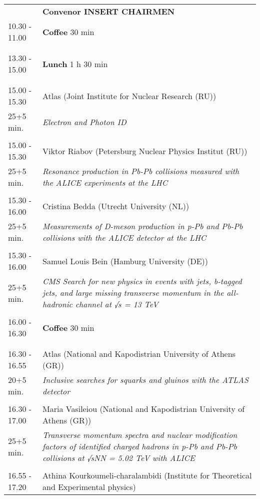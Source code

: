 \begin{longtable}{p{3cm}p{13cm}}
&\hfill {\bf Convenor INSERT CHAIRMEN }\\ 
10.30 - 11.00 & {\bf Coffee} \hfill 30 min \\ 
 & \\ 
 & \\ 
13.30 - 15.00 & {\bf Lunch} \hfill 1 h 30 min \\ 
 & \\ 
 & \\ 
15.00 - 15.30 & Atlas (Joint Institute for  Nuclear Research (RU))\\ 
25+5 min. & {\it Electron and Photon ID}\\ 
 & \\ 
15.00 - 15.30 & Viktor Riabov (Petersburg Nuclear Physics Institut (RU))\\ 
25+5 min. & {\it Resonance production in Pb-Pb collisions measured with the ALICE experiments at the LHC}\\ 
 & \\ 
15.30 - 16.00 & Cristina Bedda (Utrecht University (NL))\\ 
25+5 min. & {\it Measurements of D-meson production in p-Pb and Pb-Pb collisions with the ALICE detector at the LHC}\\ 
 & \\ 
15.30 - 16.00 & Samuel Louis Bein (Hamburg University (DE))\\ 
25+5 min. & {\it CMS Search for new physics in events with jets, b-tagged jets, and large missing transverse momentum in the all-hadronic channel at √s = 13 TeV}\\ 
 & \\ 
16.00 - 16.30 & {\bf Coffee} \hfill 30 min \\ 
 & \\ 
 & \\ 
16.30 - 16.55 & Atlas (National and Kapodistrian University of Athens (GR))\\ 
20+5 min. & {\it Inclusive searches for squarks and gluinos with the ATLAS detector}\\ 
 & \\ 
16.30 - 17.00 & Maria Vasileiou (National and Kapodistrian University of Athens (GR))\\ 
25+5 min. & {\it Transverse momentum spectra and nuclear modification factors of identified charged hadrons in p-Pb and Pb-Pb collisions at √sNN  = 5.02 TeV with ALICE}\\ 
 & \\ 
16.55 - 17.20 & Athina Kourkoumeli-charalambidi (Institute for Theoretical and Experimental physics)\\ 

\end{longtable}
